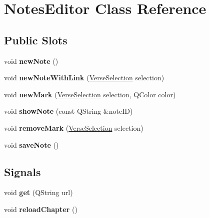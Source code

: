 \hypertarget{classNotesEditor}{
\section{NotesEditor Class Reference}
\label{classNotesEditor}
}
\subsection*{Public Slots}
\begin{DoxyCompactItemize}
\item 
\hypertarget{classNotesEditor_ac7062971fc27131ea2b3857a9a98c945}{
void {\bfseries newNote} ()}
\label{classNotesEditor_ac7062971fc27131ea2b3857a9a98c945}

\item 
\hypertarget{classNotesEditor_a386af77a2a1e0c600ec332640fc92e74}{
void {\bfseries newNoteWithLink} (\hyperlink{classVerseSelection}{VerseSelection} selection)}
\label{classNotesEditor_a386af77a2a1e0c600ec332640fc92e74}

\item 
\hypertarget{classNotesEditor_a97f958af5b9dd136d47afdf2badc8cee}{
void {\bfseries newMark} (\hyperlink{classVerseSelection}{VerseSelection} selection, QColor color)}
\label{classNotesEditor_a97f958af5b9dd136d47afdf2badc8cee}

\item 
\hypertarget{classNotesEditor_a026c22b35b861f852426a0cd27fdd175}{
void {\bfseries showNote} (const QString \&noteID)}
\label{classNotesEditor_a026c22b35b861f852426a0cd27fdd175}

\item 
\hypertarget{classNotesEditor_a6490d9a1728eeefc37e5d4350315d8b7}{
void {\bfseries removeMark} (\hyperlink{classVerseSelection}{VerseSelection} selection)}
\label{classNotesEditor_a6490d9a1728eeefc37e5d4350315d8b7}

\item 
\hypertarget{classNotesEditor_a7800f19be40adca6328e2d2f3d51b846}{
void {\bfseries saveNote} ()}
\label{classNotesEditor_a7800f19be40adca6328e2d2f3d51b846}

\end{DoxyCompactItemize}
\subsection*{Signals}
\begin{DoxyCompactItemize}
\item 
\hypertarget{classNotesEditor_afc1fe3c4611613b2cc042a9a07ab0ff8}{
void {\bfseries get} (QString url)}
\label{classNotesEditor_afc1fe3c4611613b2cc042a9a07ab0ff8}

\item 
\hypertarget{classNotesEditor_ad42610f93526658bcef17c939eb4ab51}{
void {\bfseries reloadChapter} ()}
\label{classNotesEditor_ad42610f93526658bcef17c939eb4ab51}

\end{DoxyCompactItemize}
